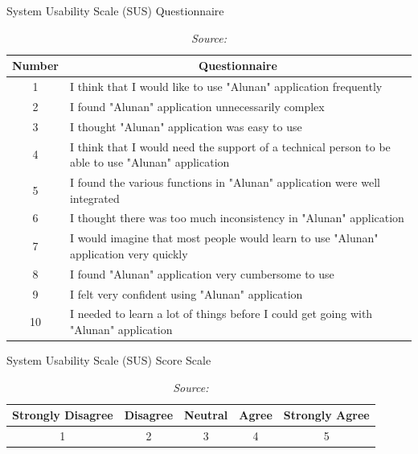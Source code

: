 \begin{table}[htb]
\caption{\centering System Usability Scale (SUS) Questionnaire}
\caption*{\centering \textit{Source: \textcite{brooke95}}} 
\label{tab:mytable}
\centering
\begin{tabular}{|p{3cm}|p{12cm}|}
\hline
\multicolumn{1}{|c|}{\textbf{Number}} & 
\multicolumn{1}{c|}{\textbf{Questionnaire}} \\
\hline 
\multicolumn{1}{|c|}{1} & I think that I would like to use "Alunan" application frequently \\ \hline
\multicolumn{1}{|c|}{2} & I found "Alunan" application unnecessarily complex \\ \hline
\multicolumn{1}{|c|}{3} & I thought "Alunan" application was easy to use \\ \hline
\multicolumn{1}{|c|}{4} & I think that I would need the support of a technical person to be able to use "Alunan" application \\ \hline
\multicolumn{1}{|c|}{5} & I found the various functions in "Alunan" application were well integrated \\ \hline
\multicolumn{1}{|c|}{6} & I thought there was too much inconsistency in "Alunan" application \\ \hline
\multicolumn{1}{|c|}{7} & I would imagine that most people would learn to use "Alunan" application very quickly \\ \hline
\multicolumn{1}{|c|}{8} & I found "Alunan" application very cumbersome to use \\ \hline
\multicolumn{1}{|c|}{9} & I felt very confident using "Alunan" application \\ \hline
\multicolumn{1}{|c|}{10} & I needed to learn a lot of things before I could get going with "Alunan" application \\ \hline
\end{tabular}
\end{table}

\begin{table}[htb]
\caption{\centering System Usability Scale (SUS) Score Scale}
\caption*{\centering \textit{Source: \textcite{brooke95}}} 
\label{tab:mytable}
\centering
\begin{tabular}{|p{5cm}|p{10cm}|p{10cm}|p{10cm}|p{5cm}|}
\hline
\multicolumn{1}{|c|}{\textbf{Strongly Disagree}} & 
\multicolumn{1}{c|}{\textbf{Disagree}} & 
\multicolumn{1}{c|}{\textbf{Neutral}} & 
\multicolumn{1}{c|}{\textbf{Agree}} & 
\multicolumn{1}{c|}{\textbf{Strongly Agree}} \\
\hline 
\multicolumn{1}{|c|}{1} & \multicolumn{1}{c|}{2} & \multicolumn{1}{c|}{3} & \multicolumn{1}{c|}{4} & \multicolumn{1}{c|}{5}\\ \hline
\end{tabular}
\end{table}
\pagebreak

